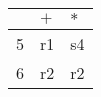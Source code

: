\documentclass{standalone}
\providecommand\lightrule{%
	\arrayrulecolor{black!30}%
	\midrule[\lightrulewidth]%
	\arrayrulecolor{black}}
\begin{document}
\begin{tabularx}{\textwidth}{XXX}
    & \(+\) & \(\ast\) \\
    \midrule
        5
        &
        r1
        &
        s4
        \\ \lightrule

        6
        &
        r2
        &
        r2
        \\
\end{tabularx}
\end{document}
